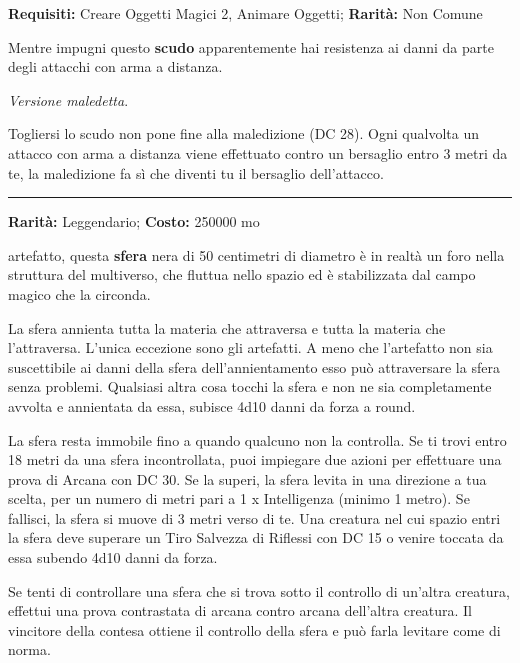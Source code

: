 \begin{multicols}{2}
\textbf{Requisiti:} Creare Oggetti Magici 2, Animare Oggetti; \textbf{Rarità:} Non Comune

Mentre impugni questo \textbf{scudo} apparentemente hai resistenza ai danni da parte degli attacchi con arma a distanza.

\emph{Versione maledetta}.

Togliersi lo scudo non pone fine alla maledizione (DC 28). Ogni qualvolta un attacco con arma a distanza viene effettuato contro un bersaglio entro 3 metri da te, la maledizione fa sì che diventi tu il bersaglio dell'attacco.

\smallskip\noindent\rule{\linewidth}{2pt}  \hypertarget{Sferadell'Annientamento}{}\smallskip{}\noindent\label{Sferadell'Annientamento}

\textbf{Rarità:} Leggendario; \textbf{Costo:} 250000 mo

artefatto, questa \textbf{sfera} nera di 50 centimetri di diametro è in realtà un foro nella struttura del multiverso, che fluttua nello spazio ed è stabilizzata dal campo magico che la circonda.

La sfera annienta tutta la materia che attraversa e tutta la materia che l'attraversa. L'unica eccezione sono gli artefatti. A meno che l'artefatto non sia suscettibile ai danni della sfera dell'annientamento esso può attraversare la sfera senza problemi. Qualsiasi altra cosa tocchi la sfera e non ne sia completamente avvolta e annientata da essa, subisce 4d10 danni da forza a round.

La sfera resta immobile fino a quando qualcuno non la controlla. Se ti trovi entro 18 metri da una sfera incontrollata, puoi impiegare due azioni per effettuare una prova di Arcana con DC 30. Se la superi, la sfera levita in una direzione a tua scelta, per un numero di metri pari a 1 x Intelligenza (minimo 1 metro). Se fallisci, la sfera si muove di 3 metri verso di te. Una creatura nel cui spazio entri la sfera deve superare un Tiro Salvezza di Riflessi con DC 15 o venire toccata da essa subendo 4d10 danni da forza.

Se tenti di controllare una sfera che si trova sotto il controllo di un'altra creatura, effettui una prova contrastata di arcana contro arcana dell'altra creatura. Il vincitore della contesa ottiene il controllo della sfera e può farla levitare come di norma.



\end{multicols}
